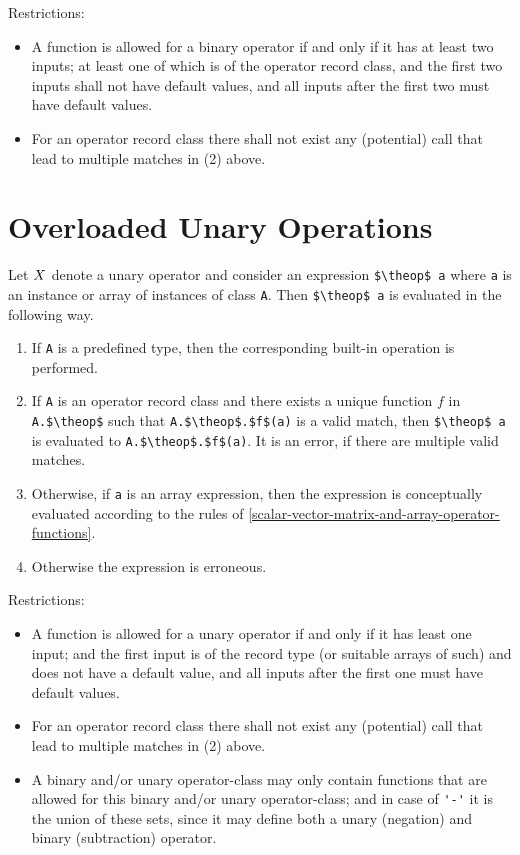 Restrictions:
\begin{itemize}
\item
  A function is allowed for a binary operator if and only if it has at
  least two inputs; at least one of which is of the operator record
  class, and the first two inputs shall not have default values, and all
  inputs after the first two must have default values.
\item
  For an operator record class there shall not exist any
  (potential) call that lead to multiple matches in (2) above.
\end{itemize}

\section{Overloaded Unary Operations}\label{overloaded-unary-operations}

Let $X$ denote a unary operator and consider an expression
\lstinline!$\theop$ a! where \lstinline!a! is an instance or array of instances of class
\lstinline!A!. Then \lstinline!$\theop$ a! is evaluated in the following way.

\begin{enumerate}
\item
  If \lstinline!A! is a predefined type, then the corresponding built-in
  operation is performed.
\item
  If \lstinline!A! is an operator record class and there exists a unique
  function $f$ in \lstinline!A.$\theop$! such that \lstinline!A.$\theop$.$f$(a)! is a valid
  match, then \lstinline!$\theop$ a! is evaluated to \lstinline!A.$\theop$.$f$(a)!. It is an
  error, if there are multiple valid matches.
\item
  Otherwise, if \lstinline!a! is an array expression, then the expression
  is conceptually evaluated according to the rules of \cref{scalar-vector-matrix-and-array-operator-functions}.
\item
  Otherwise the expression is erroneous.
\end{enumerate}

Restrictions:
\begin{itemize}
\item
  A function is allowed for a unary operator if and only if it has least
  one input; and the first input is of the record type (or suitable
  arrays of such) and does not have a default value, and all inputs
  after the first one must have default values.
\item
  For an operator record class there shall not exist any
  (potential) call that lead to multiple matches in (2) above.
\item
  A binary and/or unary operator-class may only contain functions that
  are allowed for this binary and/or unary operator-class; and in case
  of \lstinline!'-'! it is the union of these sets, since it may define both a unary
  (negation) and binary (subtraction) operator.
\end{itemize}

